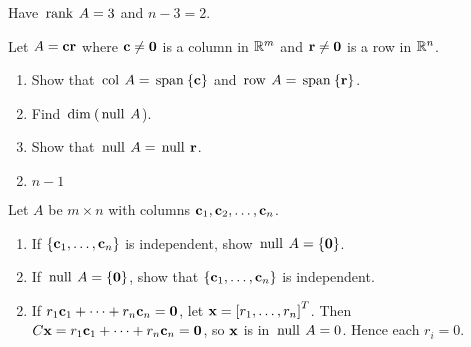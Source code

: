 {{\begin{multicols}{2}
\begin{ex}
\begin{sol}
\begin{enumerate}[label={\alph*.}]
Have $\thinspace\operatorname{rank\medspace} A = 3$ and $n - 3 = 2$.
\end{enumerate}
\end{sol}
\end{ex}

\columnbreak 

\begin{ex}
Let $A = \textbf{c}\textbf{r}$ where $\textbf{c} \neq \textbf{0}$ is a column in $\mathbb{R}^m$ and $\textbf{r} \neq \textbf{0}$ is a row in $\mathbb{R}^n$.

\begin{enumerate}[label={\alph*.}]
\item Show that $\thinspace\operatorname{col\medspace} A = \thinspace\operatorname{span\medspace}\{\textbf{c}\}$ and \newline $\thinspace\operatorname{row\medspace} A = \thinspace\operatorname{span\medspace}\{\textbf{r}\}$.

\item Find $\thinspace\operatorname{dim\medspace}(\thinspace\operatorname{null\medspace} A$).

\item Show that $\thinspace\operatorname{null\medspace} A = \thinspace\operatorname{null\medspace} \textbf{r}$.

\end{enumerate}
\begin{sol}
\begin{enumerate}[label={\alph*.}]
\setcounter{enumi}{1}
\item  $n - 1$

\end{enumerate}
\end{sol}
\end{ex}

\begin{ex}
Let $A$ be $m \times n$ with columns $\textbf{c}_{1}, \textbf{c}_{2}, \dots, \textbf{c}_{n}$.

\begin{enumerate}[label={\alph*.}]
\item If $\{\textbf{c}_{1}, \dots, \textbf{c}_{n}\}$ is independent, show $\thinspace\operatorname{null\medspace} A = \{\textbf{0}\}$.

\item If $\thinspace\operatorname{null\medspace} A = \{\textbf{0}\}$, show that $\{\textbf{c}_{1}, \dots, \textbf{c}_{n}\}$ is independent.

\end{enumerate}
\begin{sol}
\begin{enumerate}[label={\alph*.}]
\setcounter{enumi}{1}
\item  If $r_{1}\textbf{c}_{1} + \dots + r_{n}\textbf{c}_{n} = \textbf{0}$, let $\textbf{x} = \left[ r_{1}, \dots, r_{n} \right]^{T}$. Then $C\textbf{x} = r_{1}\textbf{c}_{1} + \dots + r_{n}\textbf{c}_{n} = \textbf{0}$, so $\textbf{x}$ is in $\thinspace\operatorname{null\medspace} A = 0$. Hence each $r_{i} = 0$.


\end{enumerate}
\end{sol}
\end{ex}
\end{multicols}}}
